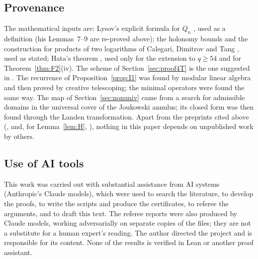 \documentclass[11pt]{amsart}
\theoremstyle{definition}
\theoremstyle{remark}
\numberwithin{equation}{section}
\begin{document}
\subsection*{Provenance}
The mathematical inputs are: Lysov's explicit formula for $Q_n$ \cite{Lys18}, used as a definition (his Lemmas~7--9 are
re-proved above); the holonomy bounds and the construction for products of two logarithms of Calegari, Dimitrov and Tang
\cite{CDT}, used as stated; Hata's theorem \cite{Hat98}, used only for the extension to $q\ge54$ and for
Theorem~\ref{thm:F2}(iv). The scheme of Section~\ref{sec:proof4T} is the one suggested in \cite[\S15.1.10]{CDT}. The
recurrence of Proposition~\ref{prop:I1} was found by modular linear algebra and then proved by creative telescoping; the
minimal operators were found the same way. The map of Section~\ref{sec:nonuniv} came from a search for admissible
domains in the universal cover of the Joukowski annulus; its closed form was then found through the Landen
transformation. Apart from the preprints cited above (\cite{CDT}, \cite{Lys18} and, for
Lemma~\ref{lem:H}, \cite{LSS20}), nothing in this paper depends on unpublished work by others.

\subsection*{Use of AI tools}
This work was carried out with substantial assistance from AI systems (Anthropic's Claude models), which were used to
search the literature, to develop the proofs, to write the scripts and produce the certificates, to referee the
arguments, and to draft this text. The referee reports were also produced by Claude models, working adversarially on
separate copies of the files; they are not a substitute for a human expert's reading. The author directed the project
and is responsible for its content. None of the results is verified in Lean or another proof assistant.

\end{document}
